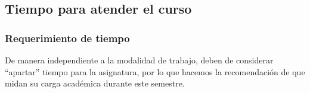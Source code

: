 \documentclass[12pt]{beamer}
\begin{document}

\subsection{Tiempo para atender el curso}

\begin{frame}
\frametitle{Requerimiento de tiempo}
De manera independiente a la modalidad de trabajo, deben de considerar \enquote{apartar} tiempo para la asignatura, por lo que hacemos la recomendación de que midan su carga académica durante este semestre.
\end{frame}
\end{document}
